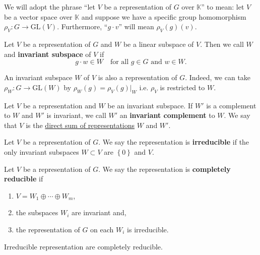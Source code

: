 \documentclass[12pt, a4paper]{article}
\newcommand{\gl}{\text{GL}}
\newcommand{\KK}{\mathbb{K}}
\begin{document}
\begin{mdremark}
    We will adopt the phrase ``let \(V\) be a representation of \(G\) over \(\KK\)'' to mean: let \(V\) be a vector space over \(\KK\) and suppose we have a specific group homomorphism \(\rho_V :G \to \gl(V)\). Furthermore, ``\(g\cdot v\)'' will mean \(\rho_V(g)(v)\).
\end{mdremark}

\begin{definition}
    Let \(V\) be a representation of \(G\) and \(W\) be a linear subspace of \(V\). Then we call \(W\) and \textbf{invariant subspace} of \(V\) if 
    \[g\cdot w\in W \quad \text{for all } g\in G \text{ and } w\in W.\]
\end{definition}

\begin{mdremark}
    An invariant subspace \(W\) of \(V\) is also a representation of \(G\). Indeed, we can take \(\rho_W : G \to \gl(W)\) by \(\rho_W(g) = \rho_V(g) \vert_W\) i.e. \(\rho_V\) is restricted to \(W\).
\end{mdremark}

\begin{definition}
    Let \(V\) be a representation and \(W\) be an invariant subspace. If \(W'\) is a complement to \(W\) and \(W'\) is invariant, we call \(W'\) an \textbf{invariant complement} to \(W\). We say that \(V\) is the \ul{direct sum of representations} \(W\) and \(W'\).
\end{definition}

\begin{definition}
    Let \(V\) be a representation of \(G\). We say the representation is \textbf{irreducible} if the only invariant subspaces \(W \subset V\) are \(\left\{ 0 \right\}\) and \(V\).
\end{definition}

\begin{definition}
    Let \(V\) be a representation of \(G\). We say the representation is \textbf{completely reducible} if 
    \begin{enumerate}
        \item \(V = W_1 \oplus \cdots \oplus W_m\),
        \item the subspaces \(W_i\) are invariant and,
        \item the representation of \(G\) on each \(W_i\) is irreducible.
    \end{enumerate}
\end{definition}

\begin{mdremark}
    Irreducible representation are completely reducible.
\end{mdremark}
\end{document}

